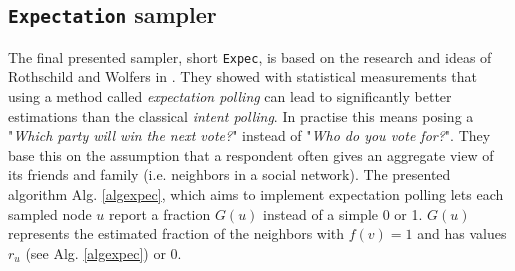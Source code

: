 \subsection{\texttt{Expectation} sampler}
The final presented sampler, short \texttt{Expec}, is based on the research and ideas of Rothschild and Wolfers in \cite{rothschild2009forecasting}. They showed with statistical measurements that using a method called \textit{expectation polling} can lead to significantly better estimations than the classical \textit{intent polling}.
In practise this means posing a "\textit{Which party will win the next vote?}" instead of "\textit{Who do you vote for?}".
They base this on the assumption that a respondent often gives an aggregate view of its friends and family (i.e. neighbors in a social network).
The presented algorithm Alg. \ref{algexpec}, which aims to implement expectation polling lets each sampled node $u$ report a fraction $G(u)$ instead of a simple 0 or 1. $G(u)$ represents the estimated fraction of the neighbors with $f(v) = 1$ and has values $r_u$ (see Alg. \ref{algexpec}) or $0$.

